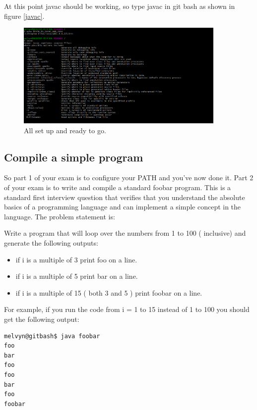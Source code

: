 \documentclass[12pt]{article}
\begin{document}
At this point javac should be working, so type javac in git bash as shown in
figure \ref{javac}.

\begin{figure}[h]
  \centering
    \includegraphics[width=0.9\textwidth]{Images/works.PNG}
  \caption{All set up and ready to go.}
	\label{errorisokay}
\end{figure}

\subsection{Compile a simple program}
So part 1 of your exam is to configure your PATH and you've now done it. Part 2
of your exam is to write and compile a standard foobar program. This is a
standard first interview question that verifies that you understand the absolute
basics of a programming language and can implement a simple concept in the
language. The problem statement is:

Write a program that will loop over the numbers from 1 to 100 ( inclusive) and
generate the following outputs:

\begin{center}
\begin{itemize}
\item if i is a multiple of 3 print foo on a line.
\item if i is a multiple of 5 print bar on a line.
\item if i is a multiple of 15 ( both 3 and 5 ) print foobar on a line.
\end{itemize}
\end{center}

For example, if you run the code from i = 1 to 15 instead of 1 to 100 you should
get the following output:

\begin{lstlisting}[language=Bash]
melvyn@gitbash$ java foobar
foo
bar
foo
foo
bar
foo
foobar
\end{lstlisting}
\end{document}
